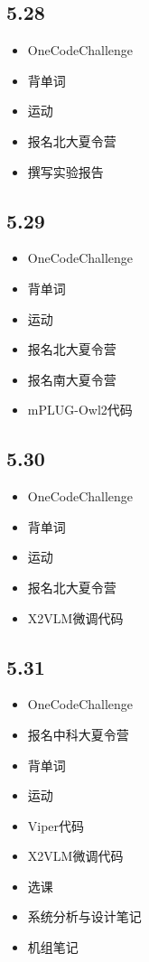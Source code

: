 \documentclass[UTF8]{ctexart}
\begin{document}
\subsection*{5.28}
\begin{itemize}
    \item OneCodeChallenge
    \item 背单词
    \item 运动
    \item 报名北大夏令营
    \item 撰写实验报告
\end{itemize}

\subsection*{5.29}
\begin{itemize}
    \item OneCodeChallenge
    \item 背单词
    \item 运动
    \item 报名北大夏令营
    \item 报名南大夏令营
    \item mPLUG-Owl2代码
\end{itemize}

\subsection*{5.30}
\begin{itemize}
    \item OneCodeChallenge
    \item 背单词
    \item 运动
    \item 报名北大夏令营
    \item X2VLM微调代码
\end{itemize}

\subsection*{5.31}
\begin{itemize}
    \item OneCodeChallenge
    \item 报名中科大夏令营
    \item 背单词
    \item 运动
    \item Viper代码
    \item X2VLM微调代码
    \item 选课
    \item 系统分析与设计笔记
    \item 机组笔记
\end{itemize}
\end{document}

